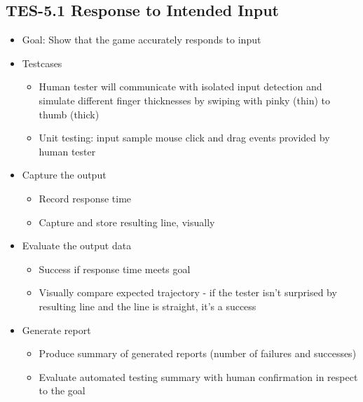 \subsection{TES-5.1 Response to Intended Input}
\begin{itemize}
\item Goal: Show that the game accurately responds to input 

\item Testcases
\begin{itemize}
\item Human tester will communicate with isolated input detection and simulate different finger thicknesses by swiping with pinky (thin) to thumb (thick)
\item Unit testing: input sample mouse click and drag events provided by human tester
\end{itemize}

\item Capture the output
\begin{itemize}
\item Record response time
\item Capture and store resulting line, visually
\end{itemize}

\item Evaluate the output data
\begin{itemize}
\item Success if response time meets goal
\item Visually compare expected trajectory - if the tester isn’t surprised by resulting line and the line is straight, it’s a success
\end{itemize}

\item Generate report
\begin{itemize}
\item Produce summary of generated reports (number of failures and successes)
\item Evaluate automated testing summary with human confirmation in respect to the goal
\end{itemize}
\end{itemize}

